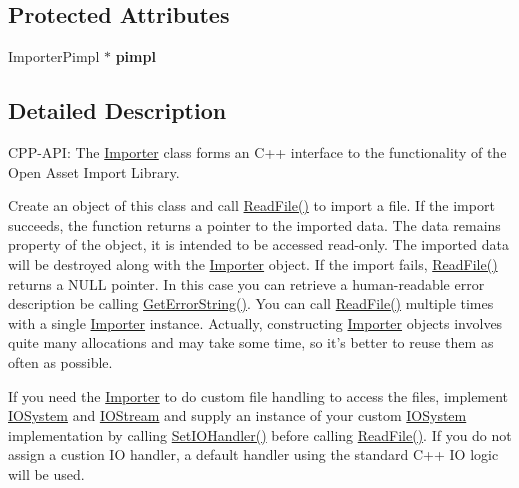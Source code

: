 \subsection*{Protected Attributes}
\begin{DoxyCompactItemize}
\item 
\hypertarget{class_assimp_1_1_importer_a3928bb8d375fd676dd5dbe33382e46ce}{Importer\-Pimpl $\ast$ {\bfseries pimpl}}\label{class_assimp_1_1_importer_a3928bb8d375fd676dd5dbe33382e46ce}

\end{DoxyCompactItemize}


\subsection{Detailed Description}
C\-P\-P-\/\-A\-P\-I\-: The \hyperlink{class_assimp_1_1_importer}{Importer} class forms an C++ interface to the functionality of the Open Asset Import Library.

Create an object of this class and call \hyperlink{class_assimp_1_1_importer_a174418ab41d5b8bc51a044895cb991e5}{Read\-File()} to import a file. If the import succeeds, the function returns a pointer to the imported data. The data remains property of the object, it is intended to be accessed read-\/only. The imported data will be destroyed along with the \hyperlink{class_assimp_1_1_importer}{Importer} object. If the import fails, \hyperlink{class_assimp_1_1_importer_a174418ab41d5b8bc51a044895cb991e5}{Read\-File()} returns a N\-U\-L\-L pointer. In this case you can retrieve a human-\/readable error description be calling \hyperlink{class_assimp_1_1_importer_a23bab5ba8cb9b6886c690a610766668b}{Get\-Error\-String()}. You can call \hyperlink{class_assimp_1_1_importer_a174418ab41d5b8bc51a044895cb991e5}{Read\-File()} multiple times with a single \hyperlink{class_assimp_1_1_importer}{Importer} instance. Actually, constructing \hyperlink{class_assimp_1_1_importer}{Importer} objects involves quite many allocations and may take some time, so it's better to reuse them as often as possible.

If you need the \hyperlink{class_assimp_1_1_importer}{Importer} to do custom file handling to access the files, implement \hyperlink{class_assimp_1_1_i_o_system}{I\-O\-System} and \hyperlink{class_assimp_1_1_i_o_stream}{I\-O\-Stream} and supply an instance of your custom \hyperlink{class_assimp_1_1_i_o_system}{I\-O\-System} implementation by calling \hyperlink{class_assimp_1_1_importer_a1161f46318af18bb86dfe0fc3edea4df}{Set\-I\-O\-Handler()} before calling \hyperlink{class_assimp_1_1_importer_a174418ab41d5b8bc51a044895cb991e5}{Read\-File()}. If you do not assign a custion I\-O handler, a default handler using the standard C++ I\-O logic will be used.

